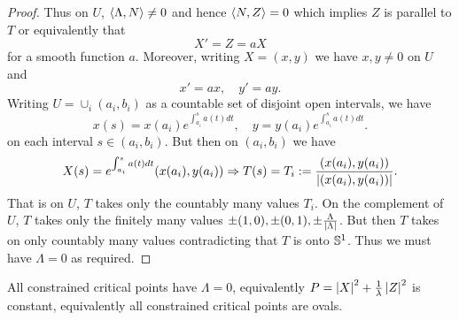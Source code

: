 \documentclass[12pt]{article}
\begin{document}
\begin{proof}
Thus on \(U\), \(\left\langle{\Lambda},{N}\right\rangle \ne 0\) and hence \(\left\langle{N},{Z}\right\rangle = 0\) which implies \(Z\) is parallel to \(T\) or equivalently that
\[
X' = Z = a X
\]
for a smooth function \(a\). Moreover, writing \(X = (x, y)\) we have \(x, y \ne 0\) on \(U\) and
\[
x' = ax, \quad y' = a y.
\]
Writing \(U = \cup_i (a_i, b_i)\) as a countable set of disjoint open intervals, we have
\[
x(s) = x(a_i) e^{\int_{a_i}^{s} a(t) dt}, \quad y = y(a_i) e^{\int_{a_i}^{s} a(t) dt}.
\]
on each interval \(s \in (a_i, b_i)\). But then on \((a_i, b_i)\) we have
\[
X(s) = e^{\int_{a_i}^{s} a(t) dt} (x(a_i), y(a_i)) \Rightarrow T(s) = T_i := \frac{(x(a_i), y(a_i))}{\left|{(x(a_i), y(a_i))}\right|}.
\]
That is on \(U\), \(T\) takes only the countably many values \(T_i\). On the complement of \(U\), \(T\) takes only the finitely many values \(\pm (1, 0), \pm (0, 1), \pm \tfrac{\Lambda}{\left|{\Lambda}\right|}\). But then \(T\) takes on only countably many values contradicting that \(T\) is onto \(\operatorname{\mathbb{S}^1}\). Thus we must have \(\Lambda = 0\) as required.
\end{proof}

\begin{conj}
All constrained critical points have \(\Lambda = 0\), equivalently \(P = \left|{X}\right|^2 + \frac{1}{\lambda} \left|{Z}\right|^2\) is constant, equivalently all constrained critical points are ovals.
\end{conj}
\end{document}
